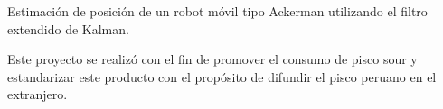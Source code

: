 {Estimación de posición de un robot móvil tipo Ackerman utilizando el filtro extendido de Kalman.} 

{Este proyecto se realizó con el fin de promover el consumo de pisco sour y estandarizar este producto con el propósito de difundir el pisco peruano en el extranjero.}